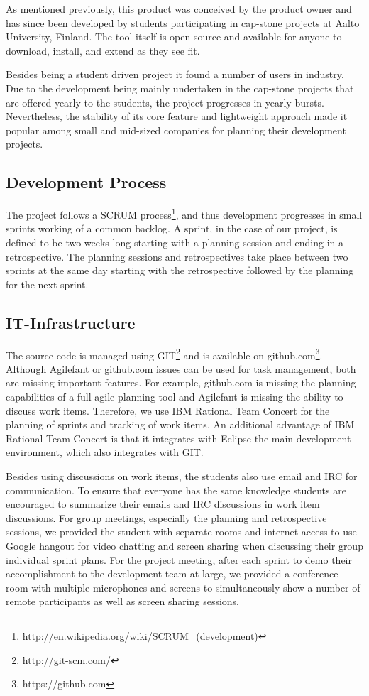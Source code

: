 As mentioned previously, this product was conceived by the product owner and has since been developed by students participating in cap-stone projects at Aalto University, Finland.
The tool itself is open source and available for anyone to download, install, and extend as they see fit.

Besides being a student driven project it found a number of users in industry.
Due to the development being mainly undertaken in the cap-stone projects that are offered yearly to the students, the project progresses in yearly bursts.
Nevertheless, the stability of its core feature and lightweight approach made it popular among small and mid-sized companies for planning their development projects.

\subsection{Development Process}
The project follows a SCRUM process\footnote{http://en.wikipedia.org/wiki/SCRUM\_(development)}, and thus development progresses in small sprints working of a common backlog.
A sprint, in the case of our project, is defined to be two-weeks long starting with a planning session and ending in a retrospective.
The planning sessions and retrospectives take place between two sprints at the same day starting with the retrospective followed by the planning for the next sprint.

\subsection{IT-Infrastructure}
The source code is managed using GIT\footnote{http://git-scm.com/} and is available on github.com\footnote{https://github.com}.
Although Agilefant or github.com issues can be used for task management, both are missing important features. 
For example, github.com is missing the planning capabilities of a full agile planning tool and Agilefant is missing the ability to discuss work items.
Therefore, we use IBM Rational Team Concert for the planning of sprints and tracking of work items.
An additional advantage of IBM Rational Team Concert is that  it integrates with Eclipse the main development environment, which also integrates with GIT. 

Besides using discussions on work items, the students also use email and IRC for communication.
To ensure that everyone has the same knowledge students are encouraged to summarize their emails and IRC discussions in work item discussions.
For group meetings, especially the planning and retrospective sessions, we provided the student with separate rooms and internet access to use Google hangout for video chatting and screen sharing when discussing their group individual sprint plans.
For the project meeting, after each sprint to demo their accomplishment to the development team at large, we provided a conference room with multiple microphones and screens to simultaneously show a number of remote participants as well as screen sharing sessions. 

